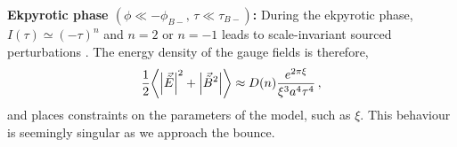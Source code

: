 \documentclass[12pt,a4paper]{article}
\numberwithin{equation}{section}
\numberwithin{equation}{section}
\begin{document}
\textbf{Ekpyrotic phase $(\phi \ll -\phi_{B-},\,\tau\ll \tau_{B-})$:} During the ekpyrotic phase, %
$I(\tau)\simeq (-\tau)^{n}$ and $n=2$ or $n=-1$ leads to scale-invariant sourced perturbations \cite{r3,r1,Artymowski:2020pci}. The energy density of the gauge fields is therefore,
\begin{equation}
     \frac{1}{2}\bigg \langle \abs{\Vec{\tilde{E}}}^2+ \abs{\Vec{\tilde{B}}^2} \bigg\rangle \approx D(n)\frac{ e^{2\pi \xi} }{\xi^3 a^4 \tau^4} \, , \label{eq:backreactionbound}
 \end{equation}
 and places constraints on the parameters of the model, such as $\xi$. This behaviour is seemingly
 singular as we approach the bounce. \\
\end{document}
